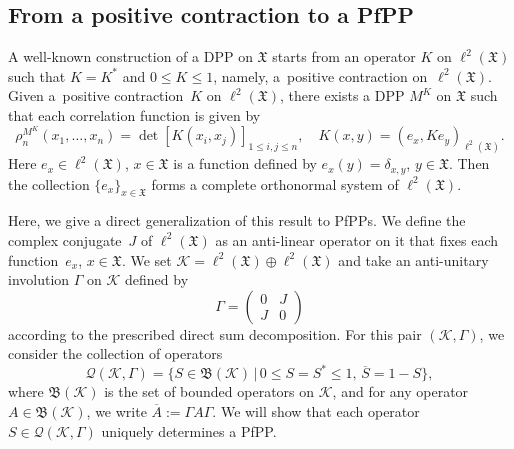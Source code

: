\documentclass[11pt]{article}
\numberwithin{equation}{section}
\numberwithin{equation}{section}
\newcommand{\mfrak}[1]{\mathfrak{#1}}
\newcommand{\mcal}[1]{\mathcal{#1}}
\begin{document}
\subsection{From a positive contraction to a PfPP}
A well-known construction of a DPP on $\mfrak{X}$ \cite{Soshnikov2000} starts from an operator $K$ on $\ell^{2}(\mfrak{X})$ such that $K=K^{\ast}$ and $0\le K\le 1$, namely, a~positive contraction on~$\ell^{2}(\mfrak{X})$. Given a~positive contraction~$K$ on $\ell^{2}(\mfrak{X})$, there exists a DPP $M^{K}$ on $\mfrak{X}$ such that each correlation function is given by
\begin{equation*}
	\rho^{M^{K}}_{n}(x_{1},\dots, x_{n})=\det [K(x_{i},x_{j}) ]_{1\le i,j\le n},\quad K(x,y)=(e_{x},Ke_{y})_{\ell^{2}(\mfrak{X})}.
\end{equation*}
Here $e_{x}\in \ell^{2}(\mfrak{X})$, $x\in\mfrak{X}$ is a function defined by $e_{x}(y)=\delta_{x,y}$, $y\in\mfrak{X}$. Then the collection $\{e_{x}\}_{x\in\mfrak{X}}$ forms a complete orthonormal system of $\ell^{2}(\mfrak{X})$.

Here, we give a direct generalization of this result to PfPPs.
We define the complex conjugate~$J$ of $\ell^{2}(\mfrak{X})$ as an anti-linear operator on it that fixes each function~$e_{x}$, $x\in\mfrak{X}$.
We set $\mcal{K}=\ell^{2}(\mfrak{X})\oplus \ell^{2}(\mfrak{X})$ and take an anti-unitary involution $\Gamma$ on $\mcal{K}$ defined by
\begin{equation}
\label{eq:Gamma}
	\Gamma=\left(
	\begin{matrix}
	0 & J \\
	J & 0
	\end{matrix}
	\right)
\end{equation}
according to the prescribed direct sum decomposition.
For this pair $(\mcal{K},\Gamma)$, we consider the collection of operators
\begin{equation}
\label{eq:collection_covariance_ops}
	\mcal{Q}(\mcal{K},\Gamma)=\big\{S\in\mfrak{B}(\mcal{K})\,|\,0\le S=S^{\ast}\le 1,\, \overline{S}=1-S\big\},
\end{equation}
where $\mfrak{B}(\mcal{K})$ is the set of bounded operators on $\mcal{K}$, and for any operator $A\in\mfrak{B}(\mcal{K})$, we write $\overline{A}:=\Gamma A\Gamma$.
We will show that each operator $S\in\mcal{Q}(\mcal{K},\Gamma)$ uniquely determines a PfPP.
\end{document}
